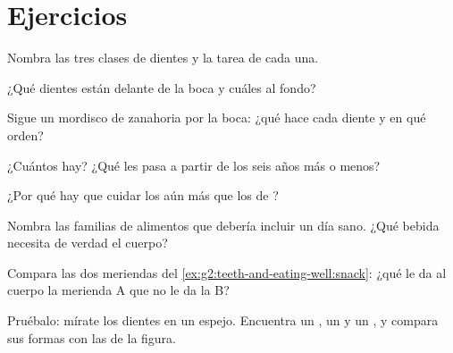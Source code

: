 \section{Ejercicios}

\begin{exercise}[$\star$]\label{exo:g2:teeth-and-eating-well:1}
Nombra las tres clases de dientes y la tarea de cada una.
\end{exercise}

\begin{exercise}[$\star$]\label{exo:g2:teeth-and-eating-well:2}
¿Qué dientes están delante de la boca y cuáles al fondo?
\end{exercise}

\begin{exercise}[$\star$]\label{exo:g2:teeth-and-eating-well:3}
Sigue un mordisco de zanahoria por la boca: ¿qué hace cada diente y en
qué orden?
\end{exercise}

\begin{exercise}[$\star$]\label{exo:g2:teeth-and-eating-well:4}
¿Cuántos  hay? ¿Qué les pasa a partir de los seis años
más o menos?
\end{exercise}

\begin{exercise}[$\star$]\label{exo:g2:teeth-and-eating-well:5}
¿Por qué hay que cuidar los  aún más que los de ?
\end{exercise}

\begin{exercise}[$\star$]\label{exo:g2:teeth-and-eating-well:6}
Nombra las familias de alimentos que debería incluir un día sano. ¿Qué
bebida necesita de verdad el cuerpo?
\end{exercise}

\begin{exercise}[$\star$]\label{exo:g2:teeth-and-eating-well:7}
Compara las dos meriendas del
\cref{ex:g2:teeth-and-eating-well:snack}: ¿qué le da al cuerpo la
merienda A que no le da la B?
\end{exercise}

\begin{exercise}[$\star$]\label{exo:g2:teeth-and-eating-well:8}
Pruébalo: mírate los dientes en un espejo. Encuentra un , un
 y un , y compara sus formas con las de la figura.
\end{exercise}

